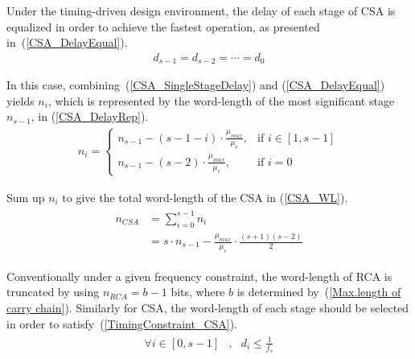 \documentclass[journal]{IEEEtran}
\begin{document}
Under the timing-driven design environment, the delay of each stage of CSA is equalized in order to achieve the fastest operation, as presented in~(\ref{CSA_DelayEqual}).
\begin{eqnarray}\label{CSA_DelayEqual}
  d_{s-1}=d_{s-2}=\cdots=d_{0}
\end{eqnarray}

In this case, combining~(\ref{CSA_SingleStageDelay}) and (\ref{CSA_DelayEqual}) yields $n_i$, which is represented by the word-length of the most significant stage $n_{s-1}$, in (\ref{CSA_DelayRep}).
\begin{eqnarray}\label{CSA_DelayRep}
 n_i=\left\{
	\begin{matrix}
	  n_{s-1}-(s-1-i)\cdot\frac{\mu_{mux}}{\mu_c}, & \textrm{if $i\in\left[1,s-1\right]$}\\
	  n_{s-1}-(s-2)\cdot\frac{\mu_{mux}}{\mu_c}, &\textrm{if $i=0$}
	\end{matrix}
    \right.
\end{eqnarray}

Sum up $n_i$ to give the total word-length of the CSA in (\ref{CSA_WL}).
\begin{eqnarray}\label{CSA_WL}
  \begin{split}
    n_{CSA} &=\sum_{i=0}^{s-1}n_{i} \\
    &= s\cdot n_{s-1}-\frac{\mu_{mux}}{\mu_{c}}\cdot\frac{(s+1)(s-2)}{2}
  \end{split}
\end{eqnarray}

Conventionally under a given frequency constraint, the word-length of RCA is truncated by using $n_{RCA}=b-1$ bits, where $b$ is determined by~(\ref{Max.length of carry chain}). Similarly for CSA, the word-length of each stage should be selected in order to satisfy~(\ref{TimingConstraint_CSA}).
\begin{eqnarray}\label{TimingConstraint_CSA}
  \begin{matrix}
    \forall i\in[0,s-1] &, & d_i\leqslant\frac{1}{f_s}
  \end{matrix}
\end{eqnarray}
\end{document}
